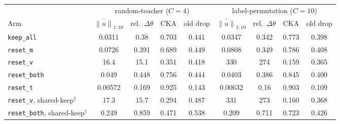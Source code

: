 \begin{tabular}{l cccc cccc}
\toprule
 & \multicolumn{4}{c}{random-teacher ($C{=}4$)} & \multicolumn{4}{c}{label-permutation ($C{=}10$)} \\
\cmidrule(lr){2-5}\cmidrule(lr){6-9}
Arm & $\bar{\|u\|}_{1:10}$ & rel.\ $\Delta\theta$ & CKA & old drop & $\bar{\|u\|}_{1:10}$ & rel.\ $\Delta\theta$ & CKA & old drop \\
\midrule
\texttt{keep\_all} & 0.0311 & 0.38 & 0.703 & 0.441 & 0.0347 & 0.342 & 0.773 & 0.398 \\
\texttt{reset\_m} & 0.0726 & 0.391 & 0.689 & 0.449 & 0.0808 & 0.349 & 0.786 & 0.408 \\
\texttt{reset\_v} & 16.4 & 15.1 & 0.351 & 0.418 & 330 & 274 & 0.159 & 0.365 \\
\texttt{reset\_both} & 0.049 & 0.448 & 0.756 & 0.444 & 0.0403 & 0.386 & 0.845 & 0.400 \\
\texttt{reset\_t} & 0.00572 & 0.169 & 0.925 & 0.143 & 0.00632 & 0.16 & 0.903 & 0.109 \\
\texttt{reset\_v}, shared-keep$^\dagger$ & 17.3 & 15.7 & 0.294 & 0.487 & 331 & 273 & 0.160 & 0.368 \\
\texttt{reset\_both}, shared-keep$^\dagger$ & 0.249 & 0.859 & 0.471 & 0.538 & 0.209 & 0.711 & 0.723 & 0.426 \\
\bottomrule
\end{tabular}
